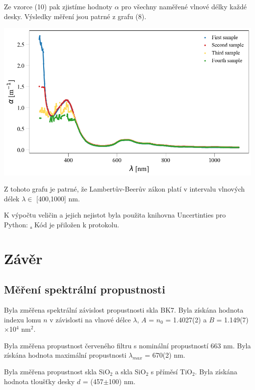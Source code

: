 \documentclass[a4paper,11pt]{article}
\begin{document}
    \begin{minipage}[t]{0.5\textwidth} 
                \par Ze vzorce (10) pak zjistíme hodnoty $\alpha$ pro všechny naměřené vlnové délky každé desky. Výsledky měření jsou patrné z grafu (8).
                \vspace{10pt}
                \raggedright 
                \par \centering
                \includegraphics[scale=0.35]{alpha}
                \captionsetup{justification=centering, font=footnotesize}
                \label{fig:alpha}
                \vspace{10pt}
                \raggedright
                \par Z tohoto grafu je patrné, že Lambertův-Beerův zákon platí v intervalu vlnových délek $\lambda \in$ [400,1000] nm.
                \vspace{10pt}
                \par K výpočtu veličin a jejich nejistot byla použita knihovna Uncertinties pro Python: \href{pypi.org/project/uncertainties}. Kód je přiložen k protokolu. 
        \section{Závěr}  
            \subsection{Měření spektrální propustnosti}
                Byla změřena spektrální závislost propustnosti skla BK7. Byla získána hodnota indexu lomu $n$ v závislosti na vlnové délce $\lambda$, $A$ = $n_0$ = 1.4027(2) a $B$ = 1.149(7)$\times$10$^4$ nm$^2$. 
                \par Byla změřena propustnost červeného filtru s nominální propustností 663 nm. Byla získána hodnota maximální propustnosti $\lambda_{max}$ = 670(2) nm.
                \par Byla změřena propustnost skla SiO$_2$ a skla SiO$_2$ s příměsí TiO$_2$. Byla získána hodnota tloušťky desky $d$ = (457$\pm$100) nm.

\end{minipage}
\end{document}
